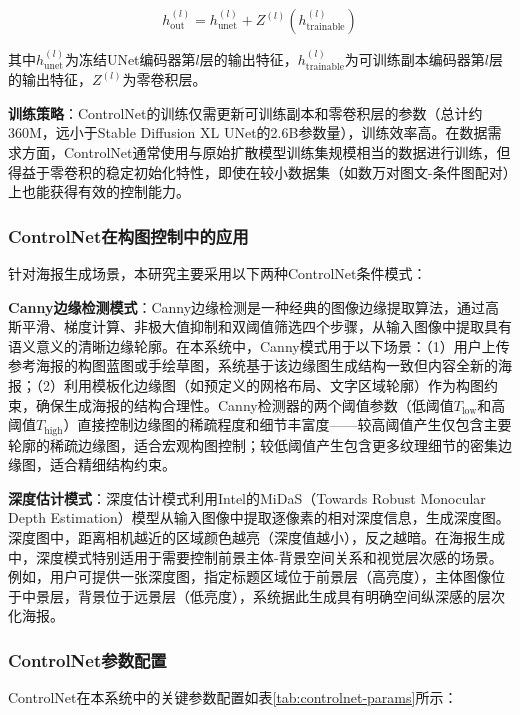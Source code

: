 \documentclass[12pt,a4paper]{ctexart}
\newcommand{\sdxl}{Stable Diffusion XL}
\newcommand{\controlnet}{ControlNet}
\begin{document}
\begin{equation}
h_{\text{out}}^{(l)} = h_{\text{unet}}^{(l)} + Z^{(l)}(h_{\text{trainable}}^{(l)})
\label{eq:zero-conv}
\end{equation}

其中$h_{\text{unet}}^{(l)}$为冻结UNet编码器第$l$层的输出特征，$h_{\text{trainable}}^{(l)}$为可训练副本编码器第$l$层的输出特征，$Z^{(l)}$为零卷积层。

\textbf{训练策略}：\controlnet{}的训练仅需更新可训练副本和零卷积层的参数（总计约360M，远小于\sdxl{} UNet的2.6B参数量），训练效率高。在数据需求方面，\controlnet{}通常使用与原始扩散模型训练集规模相当的数据进行训练，但得益于零卷积的稳定初始化特性，即使在较小数据集（如数万对图文-条件图配对）上也能获得有效的控制能力。

\subsubsection{ControlNet在构图控制中的应用}

针对海报生成场景，本研究主要采用以下两种\controlnet{}条件模式：

\textbf{Canny边缘检测模式}：Canny边缘检测是一种经典的图像边缘提取算法，通过高斯平滑、梯度计算、非极大值抑制和双阈值筛选四个步骤，从输入图像中提取具有语义意义的清晰边缘轮廓。在本系统中，Canny模式用于以下场景：（1）用户上传参考海报的构图蓝图或手绘草图，系统基于该边缘图生成结构一致但内容全新的海报；（2）利用模板化边缘图（如预定义的网格布局、文字区域轮廓）作为构图约束，确保生成海报的结构合理性。Canny检测器的两个阈值参数（低阈值$T_{\text{low}}$和高阈值$T_{\text{high}}$）直接控制边缘图的稀疏程度和细节丰富度——较高阈值产生仅包含主要轮廓的稀疏边缘图，适合宏观构图控制；较低阈值产生包含更多纹理细节的密集边缘图，适合精细结构约束。

\textbf{深度估计模式}：深度估计模式利用Intel的MiDaS（Towards Robust Monocular Depth Estimation）模型从输入图像中提取逐像素的相对深度信息，生成深度图。深度图中，距离相机越近的区域颜色越亮（深度值越小），反之越暗。在海报生成中，深度模式特别适用于需要控制前景主体-背景空间关系和视觉层次感的场景。例如，用户可提供一张深度图，指定标题区域位于前景层（高亮度），主体图像位于中景层，背景位于远景层（低亮度），系统据此生成具有明确空间纵深感的层次化海报。

\subsubsection{ControlNet参数配置}

\controlnet{}在本系统中的关键参数配置如表\ref{tab:controlnet-params}所示：
\end{document}
